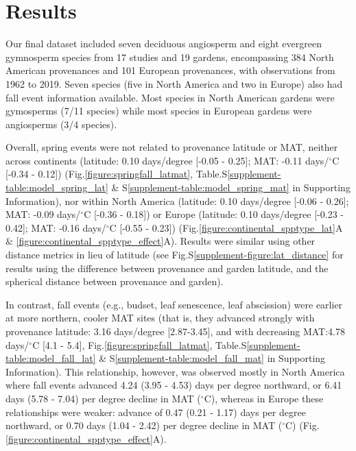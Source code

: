 \documentclass[12pt]{article}
\providecommand{\DIFaddtex}[1]{{\protect\color{blue}\uwave{#1}}} %
\providecommand{\DIFaddbegin}{} %
\providecommand{\DIFaddend}{} %
\providecommand{\DIFadd}[1]{\texorpdfstring{\DIFaddtex{#1}}{#1}} %
\newcommand{\DIFaddincludegraphics}[2][]{{\color{blue}\fbox{\DIFOincludegraphics[#1]{#2}}}} %
\DeclareRobustCommand{\DIFaddbegin}{\DIFOaddbegin \let\includegraphics\DIFaddincludegraphics} %
\DeclareRobustCommand{\DIFaddend}{\DIFOaddend \let\includegraphics\DIFOincludegraphics} %
\begin{document}

\section{Results}
Our final dataset included seven deciduous angiosperm and eight evergreen gymnosperm species from 17 studies and 19 gardens, encompassing 384 North American provenances and 101 European provenances, with observations from 1962 to 2019. Seven species (five in North America and two in Europe) also had fall event information available. Most species in North American gardens were gymosperms (7/11 species) while most species in European gardens were angiosperms (3/4 species).  


Overall, spring events \DIFaddbegin \DIFadd{such as budburst and leaf flush }\DIFaddend were not related to provenance latitude or MAT, neither across continents (latitude: 0.10 days/degree [-0.05 - 0.25]; MAT: -0.11 days/$^{\circ}$C [-0.34 - 0.12]) (Fig.\ref{figure:springfall_latmat}, Table.S\ref{supplement-table:model_spring_lat} \& S\ref{supplement-table:model_spring_mat} in Supporting Information), nor within North America (latitude: 0.10 days/degree [-0.06 - 0.26]; MAT: -0.09 days/$^{\circ}$C [-0.36 - 0.18]) or Europe (latitude: 0.10 days/degree [-0.23 - 0.42]; MAT: -0.16 days/$^{\circ}$C [-0.55 - 0.23]) (Fig.\ref{figure:continental_spptype_lat}A \& \ref{figure:continental_spptype_effect}A). Results were similar using other distance metrics in lieu of latitude (see Fig.S\ref{supplement-figure:lat_distance} for results using the difference between provenance and garden latitude, and the spherical distance between provenance and garden).



In contrast, fall events (e.g., budset, leaf senescence, leaf abscission) were earlier at more northern, cooler MAT sites (that is, they advanced strongly with provenance latitude: 3.16 days/degree [2.87-3.45], and with decreasing MAT:4.78 days/$^{\circ}$C [4.1 - 5.4], Fig.\ref{figure:springfall_latmat}, Table.S\ref{supplement-table:model_fall_lat} \& S\ref{supplement-table:model_fall_mat} in Supporting Information). This relationship, however, was observed mostly in North America where fall events advanced 4.24 (3.95 - 4.53) days per degree northward, or 6.41 days (5.78 - 7.04) per degree decline in MAT ($^{\circ}$C), whereas in Europe these relationships were weaker: advance of 0.47 (0.21 - 1.17) days per degree northward, or 0.70 days (1.04 - 2.42) per degree decline in MAT ($^{\circ}$C) (Fig.\ref{figure:continental_spptype_effect}A).
\end{document}
